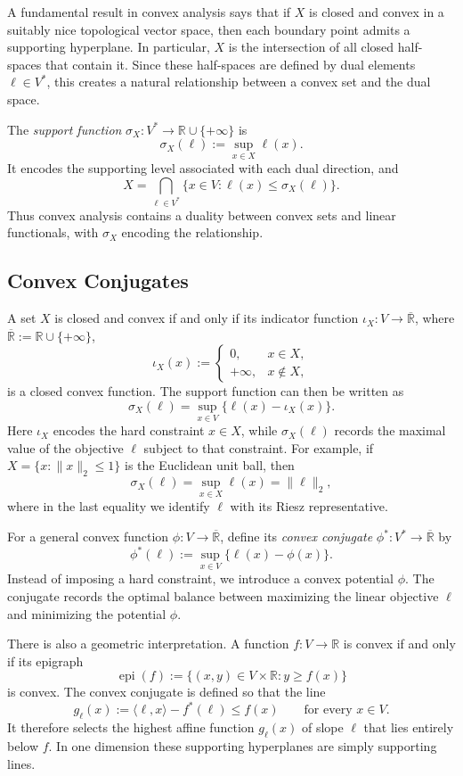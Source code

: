 \documentclass[11pt]{article}
\newcommand{\R}{\mathbb{R}}
\newcommand{\Rbar}{\overline{\mathbb{R}}}
\begin{document}
A fundamental result in convex analysis says that if $X$ is closed and convex
in a suitably nice topological vector space, then each boundary point admits a
supporting hyperplane. In particular, $X$ is the intersection of all closed
half-spaces that contain it. Since these half-spaces are defined by dual
elements $\ell\in V^*$, this creates a natural relationship between a convex
set and the dual space.

The \emph{support function} $\sigma_X:V^*\to\R\cup\{+\infty\}$ is
\[
  \sigma_X(\ell):=\sup_{x\in X}\ell(x).
\]
It encodes the supporting level associated with each dual direction, and
\[
  X=\bigcap_{\ell\in V^*}
  \{x\in V:\ell(x)\leq\sigma_X(\ell)\}.
\]
Thus convex analysis contains a duality between convex sets and linear
functionals, with $\sigma_X$ encoding the relationship.

\subsection{Convex Conjugates}

A set $X$ is closed and convex if and only if its indicator function
$\iota_X:V\to\Rbar$, where $\Rbar:=\R\cup\{+\infty\}$,
\[
  \iota_X(x):=
  \begin{cases}
    0,&x\in X,\\
    +\infty,&x\notin X,
  \end{cases}
\]
is a closed convex function. The support function can then be written as
\[
  \sigma_X(\ell)=\sup_{x\in V}\{\ell(x)-\iota_X(x)\}.
\]
Here $\iota_X$ encodes the hard constraint $x\in X$, while $\sigma_X(\ell)$
records the maximal value of the objective $\ell$ subject to that constraint.
For example, if $X=\{x:\lVert x\rVert_2\leq1\}$ is the Euclidean unit ball,
then
\[
  \sigma_X(\ell)=\sup_{x\in X}\ell(x)=\lVert\ell\rVert_2,
\]
where in the last equality we identify $\ell$ with its Riesz representative.

For a general convex function $\phi:V\to\Rbar$, define its
\emph{convex conjugate} $\phi^*:V^*\to\Rbar$ by
\[
  \phi^*(\ell):=\sup_{x\in V}\{\ell(x)-\phi(x)\}.
\]
Instead of imposing a hard constraint, we introduce a convex potential
$\phi$. The conjugate records the optimal balance between maximizing the
linear objective $\ell$ and minimizing the potential $\phi$.

There is also a geometric interpretation. A function $f:V\to\R$ is convex if
and only if its epigraph
\[
  \operatorname{epi}(f):=\{(x,y)\in V\times\R:y\geq f(x)\}
\]
is convex. The convex conjugate is defined so that the line
\[
  g_\ell(x) := \langle\ell,x\rangle-f^*(\ell)\leq f(x)
  \qquad\text{for every }x\in V.
\]
It therefore selects the highest affine function $g_\ell(x)$ of slope $\ell$ that lies
entirely below $f$. In one dimension these supporting hyperplanes are simply
supporting lines.
\end{document}

